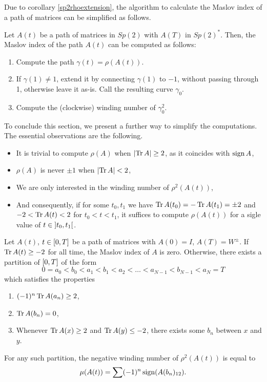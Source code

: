 Due to corollary \ref{sp2rhoextension}, the algorithm to calculate the Maslov index of a path of matrices can be simplified as follows.

\begin{prop}
Let $A(t)$ be a path of matrices in $Sp(2)$ with $A(T)$ in $Sp(2)^*$. Then, the Maslov index of the path $A(t)$ can be computed as follows:

\begin{enumerate}[algorithm]
\item Compute the path $\gamma(t) = \rho(A(t))$. 
\item If $\gamma(1) \neq 1$, extend it by connecting $\gamma(1)$ to $-1$, without passing through 1, otherwise leave it as-is. Call the resulting curve $\gamma_0$.
\item Compute the (clockwise) winding number of $\gamma_0^2$.
\end{enumerate}
\end{prop}

To conclude this section, we present a further way to simplify the computations. The essential observations are the following.
\begin{itemize}
\item It is trivial to compute $\rho(A)$ when $\lvert\operatorname{Tr} A\rvert \geq 2$, as it coincides with $\operatorname{sign} A$,
\item $\rho(A)$ is never $\pm 1$ when $\lvert\operatorname{Tr} A\rvert < 2$,
\item We are only interested in the winding number of $\rho^2(A(t))$,
\item And consequently, if for some $t_0, t_1$ we have $\operatorname{Tr} A(t_0) = - \operatorname{Tr} A(t_1) = \pm 2$ and $-2 < \operatorname{Tr} A(t) < 2$ for $t_0 < t < t_1$, it suffices to compute $\rho(A(t))$ for a sigle value of $t \in \ointerval{t_0}{t_1}$.
\end{itemize}

\begin{prop}\label{calcmaslov}
Let $A(t)$, $t \in \interval 0 T$ be a path of matrices with $A(0) = I$, $A(T) = W^\pm$. If $\operatorname{Tr} A(t) \geq -2$ for all time, the Maslov index of $A$ is zero. Otherwise, there exists a partition of $\interval 0 T$ of the form
\begin{equation}\label{calcmaslov:ab1}
0 = a_0 < b_0 < a_1 < b_1 < a_2 < \dots < a_{N-1} < b_{N-1} < a_N = T
\end{equation}
which satisfies the properties
\begin{enumerate}
\item\label{calcmaslov:ab2} $(-1)^n \operatorname{Tr} A(a_n) \geq 2$, \item\label{calcmaslov:ab3} $\operatorname{Tr} A(b_n) = 0$, \item\label{calcmaslov:ab4} Whenever $\operatorname{Tr} A(x) \geq 2$ and $\operatorname{Tr} A(y) \leq -2$, there exists some $b_n$ between $x$ and $y$.\end{enumerate}

For any such partition, the negative winding number of $\rho^2(A(t))$ is equal to
\begin{equation}\label{calcmaslov:mu}
\mu(A(t)) = \sum (-1)^n \operatorname{sign}(A(b_n)_{12}).
\end{equation}
\end{prop}


